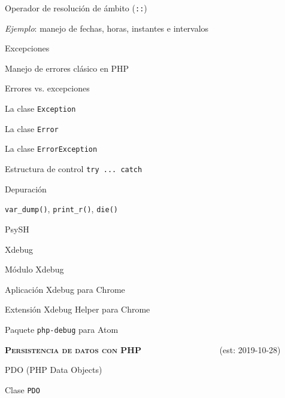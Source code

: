 \begin{longenum}
\begin{longenum}
\begin{longenum}
\begin{longenum}
                \item Operador de resolución de ámbito (\texttt{::})
            \end{longenum}
            \item \textit{Ejemplo}: manejo de fechas, horas, instantes e intervalos
        \end{longenum}
        \item Excepciones
        \begin{longenum}
            \item Manejo de errores clásico en PHP
            \item Errores vs. excepciones
            \item La clase \texttt{Exception}
            \item La clase \texttt{Error}
            \item La clase \texttt{ErrorException}
            \item Estructura de control \texttt{try ... catch}
        \end{longenum}
        \item Depuración
        \begin{longenum}
            \item \texttt{var\_dump()}, \texttt{print\_r()}, \texttt{die()}
            \item PsySH
            \item Xdebug \opcional\
            \begin{longenum}
                \item Módulo Xdebug
                \item Aplicación Xdebug para Chrome
                \item Extensión Xdebug Helper para Chrome
                \item Paquete \texttt{php-debug} para Atom
            \end{longenum}
        \end{longenum}
    \end{longenum}
    \item \textbf{\textsc{Persistencia de datos con PHP}} \ \ \ \ \ \ \ \ \ \ \ \ \ \ \ \ \ \ (est: \mbox{2019-10-28})
    \begin{longenum}
        \item PDO (PHP Data Objects)
        \begin{longenum}
            \item Clase \texttt{PDO}

\end{longenum}
\end{longenum}
\end{longenum}
